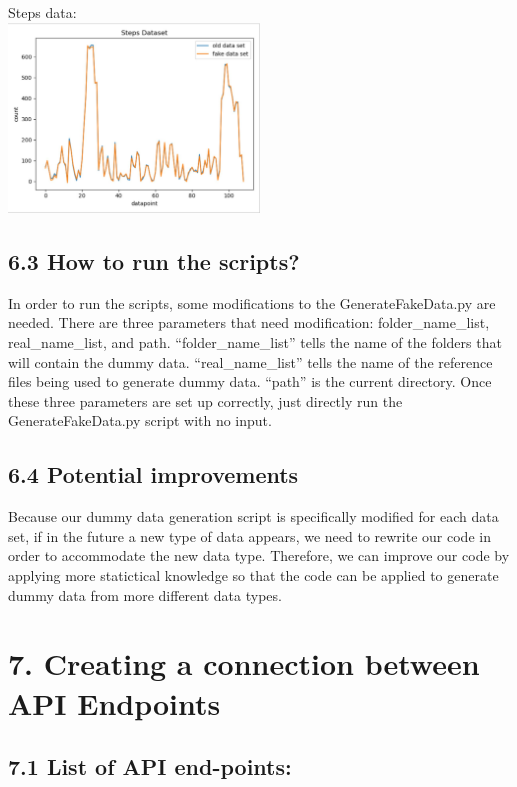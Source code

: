 \documentclass[]{book}
\begin{document}
Steps data:\\
\includegraphics[width=0.50000\textwidth]{./images/Steps Data.JPG}

\subsection{6.3 How to run the scripts?}\label{how-to-run-the-scripts-1}

In order to run the scripts, some modifications to the
GenerateFakeData.py are needed. There are three parameters that need
modification: folder\_name\_list, real\_name\_list, and path.
``folder\_name\_list'' tells the name of the folders that will contain
the dummy data. ``real\_name\_list'' tells the name of the reference
files being used to generate dummy data. ``path'' is the current
directory. Once these three parameters are set up correctly, just
directly run the GenerateFakeData.py script with no input.

\subsection{6.4 Potential improvements}\label{potential-improvements-1}

Because our dummy data generation script is specifically modified for
each data set, if in the future a new type of data appears, we need to
rewrite our code in order to accommodate the new data type. Therefore,
we can improve our code by applying more statictical knowledge so that
the code can be applied to generate dummy data from more different data
types.

\section{7. Creating a connection between API
Endpoints}\label{creating-a-connection-between-api-endpoints-1}

\subsection{7.1 List of API end-points:}\label{list-of-api-end-points-1}
\end{document}
